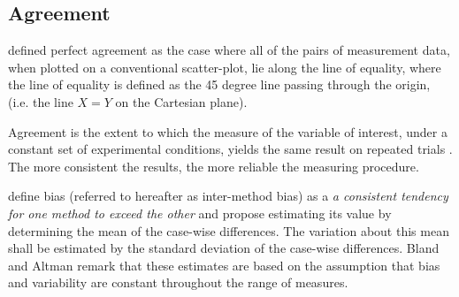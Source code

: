 \documentclass[12pt, a4paper]{report}
\theoremstyle{plain}
\theoremstyle{definition}
\theoremstyle{remark}
\begin{document}
	
	
	
	
	
	
\subsection{Agreement}
\citet{BA86} defined perfect agreement as the case where all of the pairs of measurement data, when plotted on a conventional scatter-plot, lie along the line of equality, where the line of equality is defined as the 45 degree line passing through the origin, (i.e. the line $X=Y$ on the Cartesian plane). 
	
	
	
Agreement is the extent to which the measure of the variable of interest, under a constant set of experimental conditions, yields the same result on repeated trials \citep{sanchez1999}. The more consistent the results, the more reliable the measuring procedure.
	
	
\citet{BA83} define bias (referred to hereafter as inter-method bias) as a \emph{a consistent tendency for one method to exceed the other} and propose estimating its value by determining the mean of the case-wise differences. The variation about this mean shall be estimated by the  standard deviation of the case-wise differences. Bland and Altman remark that these estimates are based on the assumption that bias and variability are constant throughout the range of measures.
	
\end{document}
